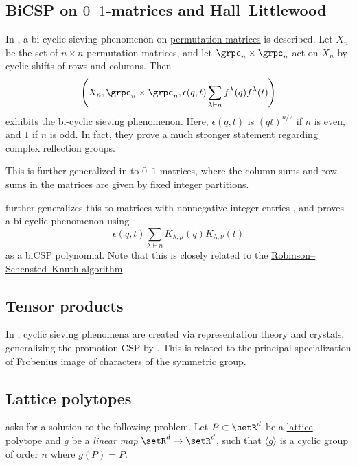 \subsection[csp01Matrices]{BiCSP on $0$--$1$-matrices and Hall--Littlewood}

In \cite{BarceloReinerStanton2008}, a bi-cyclic sieving phenomenon on
\hyperref[permutationMatrix]{permutation matrices} is described.
Let $X_n$ be the set of $n\times n$ permutation matrices,
and let $\grpc_n \times \grpc_n$ act on $X_n$ by cyclic shifts of rows and columns.
Then
\[
\left(X_n, \grpc_n \times \grpc_n, \epsilon(q,t)\sum_{\lambda \vdash n} f^\lambda(q) f^\lambda(t) \right)
\]
exhibits the bi-cyclic sieving phenomenon.
Here, $\epsilon(q,t)$ is $(qt)^{n/2}$ if $n$ is even, and $1$ if $n$ is odd.
In fact, they prove a much stronger statement regarding complex reflection groups.

This is further generalized in \cite{Rhoades2010b} to $0$--$1$-matrices,
where the column sums and row sums in the matrices are given by fixed integer partitions.

 further generalizes this to matrices with nonnegative
integer entries \cite{Rhoades2010b}, and proves a bi-cyclic phenomenon using
\[
\epsilon(q,t)\sum_{\lambda \vdash n} K_{\lambda,\mu}(q) K_{\lambda,\nu}(t)
\]
as a biCSP polynomial.  Note that this is closely
related to the \hyperref[rsk]{Robinson--Schensted--Knuth algorithm}.



\subsection[cspTensors]{Tensor products}

In \cite{Westbury2016}, cyclic sieving phenomena are created via representation theory
and crystals, generalizing the promotion CSP by .
This is related to the principal specialization of
\hyperref[frobeniusCharacteristic]{Frobenius image} of
characters of the symmetric group.



\subsection[cspLatticePolytopes]{Lattice polytopes}

 asks for a solution to the following problem.
Let $P \subset \setR^d$ be a \hyperref[latticePolytope]{lattice polytope} and
$g$ be a \emph{linear map} $\setR^d \to \setR^d$, such that
$\langle g \rangle$ is a cyclic group of order $n$ where $g(P) = P$.


